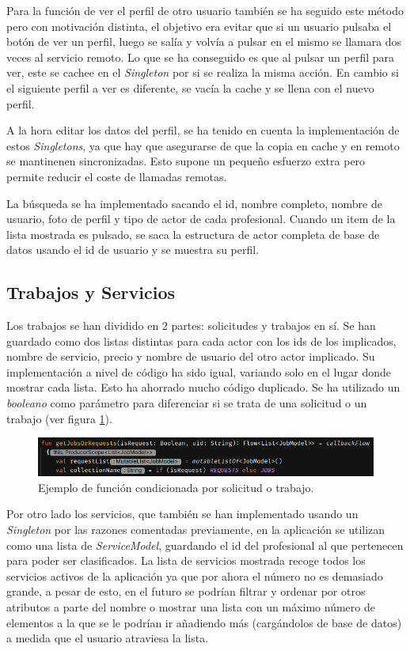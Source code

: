 Para la función de ver el perfil de otro usuario también se ha seguido este método pero con motivación distinta, el objetivo era evitar que si un usuario pulsaba el botón de ver un perfil, luego se salía y volvía a pulsar en el mismo se llamara dos veces al servicio remoto. Lo que se ha conseguido es que al pulsar un perfil para ver, este se cachee en el \textit{Singleton} por si se realiza la misma acción. En cambio si el siguiente perfil a ver es diferente, se vacía la cache y se llena con el nuevo perfil.

A la hora editar los datos del perfil, se ha tenido en cuenta la implementación de estos \textit{Singletons}, ya que hay que asegurarse de que la copia en cache y en remoto se mantinenen sincronizadas. Esto supone un pequeño esfuerzo extra pero permite reducir el coste de llamadas remotas.

La búsqueda se ha implementado sacando el id, nombre completo, nombre de usuario, foto de perfil y tipo de actor de cada profesional. Cuando un item de la lista mostrada es pulsado, se saca la estructura de actor completa de base de datos usando el id de usuario y se muestra su perfil. 

\subsection{Trabajos y Servicios} 
Los trabajos se han dividido en 2 partes: solicitudes y trabajos en sí. Se han guardado como dos listas distintas para cada actor con los ids de los implicados, nombre de servicio, precio y nombre de usuario del otro actor implicado. Su implementación a nivel de código ha sido igual, variando solo en el lugar donde mostrar cada lista. Esto ha ahorrado mucho código duplicado. Se ha utilizado un \textit{booleano} como parámetro para diferenciar si se trata de una solicitud o un trabajo (ver figura \ref{fig:getJobOrRequest}).
\begin{figure}[h]
    \centering
    \includegraphics[width = 1\textwidth]{Imagenes/Fuentes/getJobOrRequest.png}
    \caption{Ejemplo de función condicionada por solicitud o trabajo.}
    \label{fig:getJobOrRequest}
\end{figure}

Por otro lado los servicios, que también se han implementado usando un \textit{Singleton} por las razones comentadas previamente, en la aplicación se utilizan como una lista de \textit{ServiceModel}, guardando el id del profesional al que pertenecen para poder ser clasificados. La lista de servicios mostrada recoge todos los servicios activos de la aplicación ya que por ahora el número no es demasiado grande, a pesar de esto, en el futuro se podrían filtrar y ordenar por otros atributos a parte del nombre o mostrar una lista con un máximo número de elementos a la que se le podrían ir añadiendo más (cargándolos de base de datos) a medida que el usuario atraviesa la lista.

